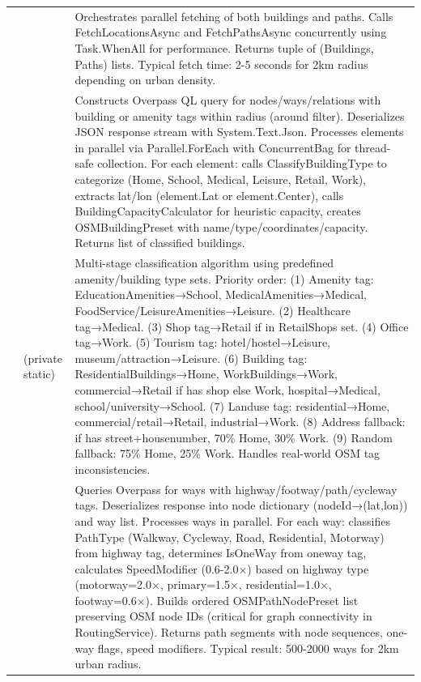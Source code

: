 \begin{longtable}{|L{4cm}|L{4cm}|L{6cm}|}
 & 
 & 
Orchestrates parallel fetching of both buildings and paths. Calls FetchLocationsAsync and FetchPathsAsync concurrently using Task.WhenAll for performance. Returns tuple of (Buildings, Paths) lists. Typical fetch time: 2-5 seconds for 2km radius depending on urban density. \\
&  & 
Constructs Overpass QL query for nodes/ways/relations with building or amenity tags within radius (around filter). Deserializes JSON response stream with System.Text.Json. Processes elements in parallel via Parallel.ForEach with ConcurrentBag for thread-safe collection. For each element: calls ClassifyBuildingType to categorize (Home, School, Medical, Leisure, Retail, Work), extracts lat/lon (element.Lat or element.Center), calls BuildingCapacityCalculator for heuristic capacity, creates OSMBuildingPreset with name/type/coordinates/capacity. Returns list of classified buildings. \\
&  (private static) & 
Multi-stage classification algorithm using predefined amenity/building type sets. Priority order: (1) Amenity tag: EducationAmenities→School, MedicalAmenities→Medical, FoodService/LeisureAmenities→Leisure. (2) Healthcare tag→Medical. (3) Shop tag→Retail if in RetailShops set. (4) Office tag→Work. (5) Tourism tag: hotel/hostel→Leisure, museum/attraction→Leisure. (6) Building tag: ResidentialBuildings→Home, WorkBuildings→Work, commercial→Retail if has shop else Work, hospital→Medical, school/university→School. (7) Landuse tag: residential→Home, commercial/retail→Retail, industrial→Work. (8) Address fallback: if has street+housenumber, 70\% Home, 30\% Work. (9) Random fallback: 75\% Home, 25\% Work. Handles real-world OSM tag inconsistencies. \\
&  & 
Queries Overpass for ways with highway/footway/path/cycleway tags. Deserializes response into node dictionary (nodeId→(lat,lon)) and way list. Processes ways in parallel. For each way: classifies PathType (Walkway, Cycleway, Road, Residential, Motorway) from highway tag, determines IsOneWay from oneway tag, calculates SpeedModifier (0.6-2.0×) based on highway type (motorway=2.0×, primary=1.5×, residential=1.0×, footway=0.6×). Builds ordered OSMPathNodePreset list preserving OSM node IDs (critical for graph connectivity in RoutingService). Returns path segments with node sequences, one-way flags, speed modifiers. Typical result: 500-2000 ways for 2km urban radius. \\

\end{longtable}
